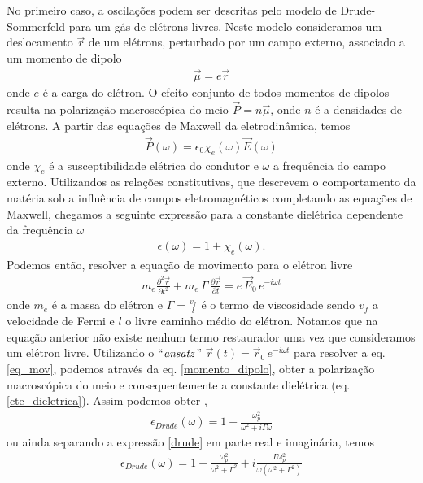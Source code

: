 No primeiro caso, a oscilações podem ser descritas pelo modelo de Drude-Sommerfeld para um gás de elétrons livres. Neste modelo consideramos um deslocamento $\vec{r}$ de um elétrons, perturbado por um campo externo, associado a um momento de dipolo 
\begin{eqnarray}
 \vec{\mu}=e\vec{r}
\label{momento_dipolo}
\end{eqnarray}
onde $e$ é a carga do elétron. O efeito conjunto de todos momentos de dipolos resulta na polarização macroscópica do meio $\vec{P}=n\vec{\mu}$, onde $n$ é a densidades de elétrons. A partir das equações de Maxwell da eletrodinâmica, temos
\begin{eqnarray}
 \vec{P}(\omega) = \epsilon_{0} \chi_{e}(\omega)\vec{E}(\omega)
\label{pol_linear}
\end{eqnarray}
onde $\chi_e$ é a susceptibilidade elétrica do condutor e $\omega$ a frequência do campo externo. Utilizandos as relações constitutivas,  que descrevem o comportamento da matéria sob a influência de campos eletromagnéticos completando as equações de Maxwell, chegamos a seguinte expressão para a constante dielétrica dependente da frequência $\omega$
\begin{eqnarray}
 \epsilon(\omega)=1+\chi_e(\omega).
\label{cte_dieletrica}
\end{eqnarray}
Podemos então, resolver a equação de movimento para o elétron livre
\begin{eqnarray}
 m_e \frac{\partial^2\vec{r}}{\partial t^2} + m_e\, \Gamma \, \frac{\partial\vec{r}}{\partial t} = e \, \vec{E}_0 \, e^{-i \omega t}
\label{eq_mov}
\end{eqnarray}
onde $m_e$ é a massa do elétron e $\Gamma = \frac{v_f}{l}$ é o termo de viscosidade sendo $v_f$ a velocidade de Fermi e $l$ o livre caminho médio do elétron. Notamos que na equação anterior não existe nenhum termo restaurador uma vez que consideramos um elétron livre. Utilizando o ``$\it{ansatz}$'' $\vec{r}(t)=\vec{r}_0 \, e^{-i \omega t}$ para resolver a eq. \ref{eq_mov}, podemos através da eq. \ref{momento_dipolo}, obter a polarização macroscópica do meio e consequentemente a constante dielétrica (eq. \ref{cte_dieletrica}). Assim podemos obter \cite{principle,jackson},
\begin{eqnarray}
 \epsilon_{Drude}(\omega)= 1-\frac{\omega_p^2}{\omega^2+i\Gamma\omega}
\label{drude}
\end{eqnarray}
ou ainda separando a expressão \ref{drude} em parte real e imaginária, temos
\begin{eqnarray}
  \epsilon_{Drude}(\omega)= 1-\frac{\omega_p^2}{\omega^2+\Gamma^2}+i\frac{\Gamma\omega_p^2}{\omega(\omega^2+\Gamma^2)}
\end{eqnarray}
